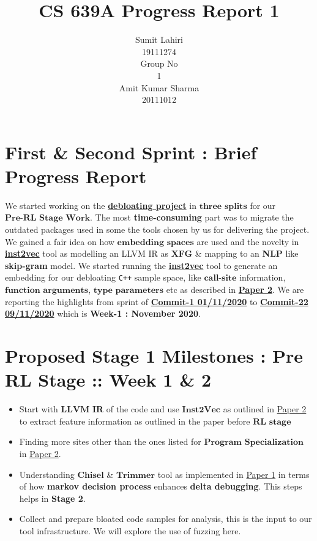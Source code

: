 \documentclass{article} %
\title{CS 639A Progress Report 1}
\author{
Sumit Lahiri \\
19111274 \\
\And
Group No\\
1\\
\And
Amit Kumar Sharma \\
20111012\\
}
\begin{document}
\maketitle

\section*{First \& Second Sprint : Brief Progress Report}
We started working on the \textbf{\href{https://github.com/lahiri-phdworks/reinforcedlearning-debloater}{debloating project}} in $\textbf{three splits}$ for our $\textbf{Pre-RL Stage Work}$. The most \textbf{time-consuming} part was to migrate the outdated packages used in some the tools chosen by us for delivering the project. We gained a fair idea on how $\textbf{embedding spaces}$ are used and the novelty in \textbf{\href{https://github.com/lahiri-phdworks/ncc}{inst2vec}} tool as modelling an LLVM IR as \textbf{XFG} \& mapping to an \textbf{NLP} like \textbf{skip-gram} model. We started running the \textbf{\href{https://github.com/lahiri-phdworks/ncc}{inst2vec}} tool to generate an embedding for our debloating \texttt{C++} sample space, like $\textbf{call-site}$ information, $\textbf{function arguments}$, $\textbf{type parameters}$ etc as described in \textbf{\href{http://www.csl.sri.com/users/gehani/papers/MLSys-2019.DeepOCCAM.pdf}{Paper 2}}. We are reporting the highlights from sprint of \textbf{\href{https://github.com/lahiri-phdworks/reinforcedlearning-debloater/commit/dd63911895cb31cdc77c9debd57090422ffb3b65}{Commit-1 01/11/2020}} to 
\textbf{\href{https://github.com/lahiri-phdworks/reinforcedlearning-debloater/commit/8066e7b7b7fa7513e3611e3f3aee6fb72c81ea83}{Commit-22 09/11/2020}} which is \textbf{Week-1 : November 2020}.

\section*{\color{azure(colorwheel)} Proposed Stage 1 Milestones : Pre RL Stage :: Week 1 \& 2}
\begin{itemize}
	\item Start with $\textbf{LLVM IR}$ of the code and use $\textbf{Inst2Vec}$ as outlined in \href{http://www.csl.sri.com/users/gehani/papers/MLSys-2019.DeepOCCAM.pdf}{Paper 2} to extract feature information as outlined in the paper before $\textbf{RL stage}$
	\item Finding more sites other than the ones listed for $\textbf{Program Specialization}$ in \href{http://www.csl.sri.com/users/gehani/papers/MLSys-2019.DeepOCCAM.pdf}{Paper 2}.  
	\item Understanding $\textbf{Chisel}$ \& $\textbf{Trimmer}$ tool as implemented in \href{https://dl.acm.org/doi/10.1145/3243734.3243838}{Paper 1} in terms of how \textbf{markov decision process} enhances \textbf{delta debugging}. This steps helps in \textbf{Stage 2}.
	\item Collect and prepare bloated code samples for analysis, this is the input to our tool infrastructure. We will explore the use of fuzzing here.  
\end{itemize}
\end{document}
